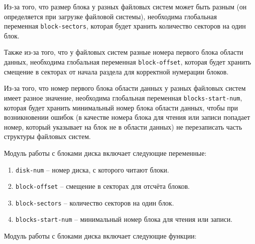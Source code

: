 Из-за того, что размер блока у разных файловых систем может быть разным (он определяется при загрузке файловой системы), необходима глобальная переменная \texttt{block-sectors}, которая будет хранить количество секторов на один блок.

Также из-за того, что у файловых систем разные номера первого блока области данных, необходима глобальная переменная \texttt{block-offset}, которая будет хранить смещение в секторах от начала раздела для корректной нумерации блоков.

Из-за того, что номер первого блока области данных у разных файловых систем имеет разное значение, необходима глобальная переменная \texttt{blocks-start-num}, которая будет хранить минимальный номер блока области данных, чтобы при возникновении ошибок (в качестве номера блока для чтения или записи попадает номер, который указывает на блок не в области данных) не перезаписать часть структуры файловых систем.

Модуль работы с блоками диска включает следующие переменные:

\begin{enumerate}
	\item \texttt{disk-num} -- номер диска, с которого читают блоки.
	\item \texttt{block-offset} -- смещение в секторах для отсчёта блоков.
	\item \texttt{block-sectors} -- количество секторов на один блок.
	\item \texttt{blocks-start-num} -- минимальный номер блока для чтения или записи.
\end{enumerate}

Модуль работы с блоками диска включает следующие функции:

